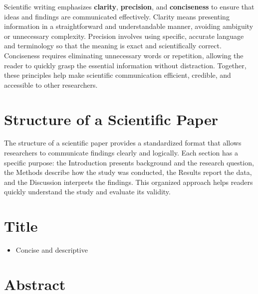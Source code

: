 \documentclass[
  letterpaper,
  DIV=11,
  numbers=noendperiod]{scrreprt}
\providecommand{\tightlist}{%
  \setlength{\itemsep}{0pt}\setlength{\parskip}{0pt}}
\begin{document}

Scientific writing emphasizes \textbf{clarity}, \textbf{precision}, and
\textbf{conciseness} to ensure that ideas and findings are communicated
effectively. Clarity means presenting information in a straightforward
and understandable manner, avoiding ambiguity or unnecessary complexity.
Precision involves using specific, accurate language and terminology so
that the meaning is exact and scientifically correct. Conciseness
requires eliminating unnecessary words or repetition, allowing the
reader to quickly grasp the essential information without distraction.
Together, these principles help make scientific communication efficient,
credible, and accessible to other researchers.

\section*{\texorpdfstring{\textbf{Structure of a Scientific
Paper}}{Structure of a Scientific Paper}}\label{structure-of-a-scientific-paper}


The structure of a scientific paper provides a standardized format that
allows researchers to communicate findings clearly and logically. Each
section has a specific purpose: the Introduction presents background and
the research question, the Methods describe how the study was conducted,
the Results report the data, and the Discussion interprets the findings.
This organized approach helps readers quickly understand the study and
evaluate its validity.

\section*{\texorpdfstring{\textbf{Title}}{Title}}\label{title}


\begin{itemize}
\tightlist
\item
  Concise and descriptive
\end{itemize}

\section*{\texorpdfstring{\textbf{Abstract}}{Abstract}}\label{abstract}
\end{document}
